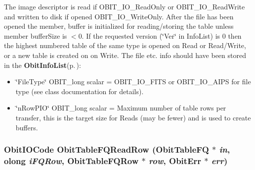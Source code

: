 The image descriptor is read if OBIT\_\-IO\_\-Read\-Only or OBIT\_\-IO\_\-Read\-Write and written to disk if opened OBIT\_\-IO\_\-Write\-Only. After the file has been opened the member, buffer is initialized for reading/storing the table unless member buffer\-Size is $<$0. If the requested version (\char`\"{}Ver\char`\"{} in Info\-List) is 0 then the highest numbered table of the same type is opened on Read or Read/Write, or a new table is created on on Write. The file etc. info should have been stored in the {\bf Obit\-Info\-List}{\rm (p.\,\pageref{structObitInfoList})}: \begin{itemize}
\item \char`\"{}File\-Type\char`\"{} OBIT\_\-long scalar = OBIT\_\-IO\_\-FITS or OBIT\_\-IO\_\-AIPS for file type (see class documentation for details). \item \char`\"{}n\-Row\-PIO\char`\"{} OBIT\_\-long scalar = Maximum number of table rows per transfer, this is the target size for Reads (may be fewer) and is used to create buffers. 
\end{itemize}
\subsubsection{\setlength{\rightskip}{0pt plus 5cm}Obit\-IOCode Obit\-Table\-FQRead\-Row ({\bf Obit\-Table\-FQ} $\ast$ {\em in}, {\bf olong} {\em i\-FQRow}, {\bf Obit\-Table\-FQRow} $\ast$ {\em row}, {\bf Obit\-Err} $\ast$ {\em err})}\label{ObitTableFQ_8h_a18}


